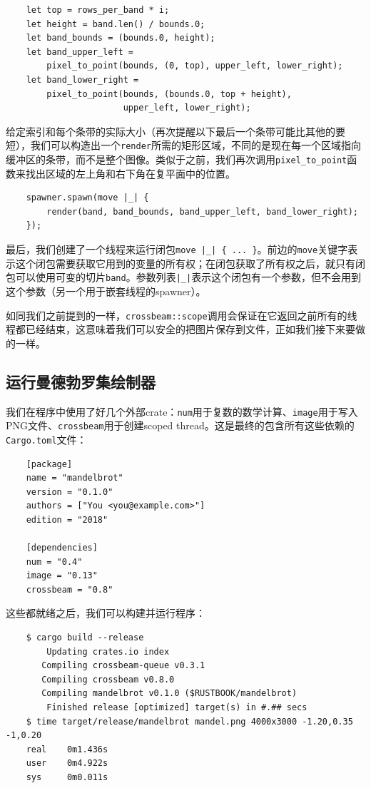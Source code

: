 \begin{verbatim}
    let top = rows_per_band * i;
    let height = band.len() / bounds.0;
    let band_bounds = (bounds.0, height);
    let band_upper_left = 
        pixel_to_point(bounds, (0, top), upper_left, lower_right);
    let band_lower_right = 
        pixel_to_point(bounds, (bounds.0, top + height),
                       upper_left, lower_right);
\end{verbatim}
给定索引和每个条带的实际大小（再次提醒以下最后一个条带可能比其他的要短），我们可以构造出一个\texttt{render}所需的矩形区域，不同的是现在每一个区域指向缓冲区的条带，而不是整个图像。类似于之前，我们再次调用\texttt{pixel\_to\_point}函数来找出区域的左上角和右下角在复平面中的位置。

\begin{verbatim}
    spawner.spawn(move |_| {
        render(band, band_bounds, band_upper_left, band_lower_right);
    });
\end{verbatim}

最后，我们创建了一个线程来运行闭包\texttt{move |\_| \{ ... \}}。前边的\texttt{move}关键字表示这个闭包需要获取它用到的变量的所有权；在闭包获取了所有权之后，就只有闭包可以使用可变的切片\texttt{band}。参数列表\texttt{|\_|}表示这个闭包有一个参数，但不会用到这个参数（另一个用于嵌套线程的spawner）。

如同我们之前提到的一样，\texttt{crossbeam::scope}调用会保证在它返回之前所有的线程都已经结束，这意味着我们可以安全的把图片保存到文件，正如我们接下来要做的一样。

\subsection{运行曼德勃罗集绘制器}

我们在程序中使用了好几个外部crate：\texttt{num}用于复数的数学计算、\texttt{image}用于写入PNG文件、\texttt{crossbeam}用于创建scoped thread。这是最终的包含所有这些依赖的\texttt{Cargo.toml}文件：
\begin{verbatim}
    [package]
    name = "mandelbrot"
    version = "0.1.0"
    authors = ["You <you@example.com>"]
    edition = "2018"

    [dependencies]
    num = "0.4"
    image = "0.13"
    crossbeam = "0.8"
\end{verbatim}

这些都就绪之后，我们可以构建并运行程序：
\begin{verbatim}
    $ cargo build --release
        Updating crates.io index
       Compiling crossbeam-queue v0.3.1
       Compiling crossbeam v0.8.0
       Compiling mandelbrot v0.1.0 ($RUSTBOOK/mandelbrot)
        Finished release [optimized] target(s) in #.## secs
    $ time target/release/mandelbrot mandel.png 4000x3000 -1.20,0.35 -1,0.20
    real    0m1.436s
    user    0m4.922s
    sys     0m0.011s
\end{verbatim}

